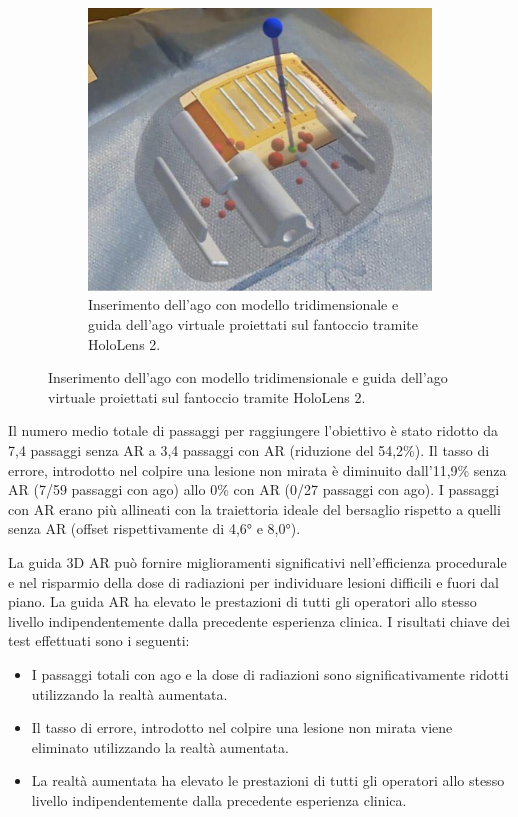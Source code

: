 \begin{figure}[t]
\begin{subfigure}{0.45\textwidth}
        \includegraphics[width=\textwidth]{images/phantom-ologram.png}
        \caption{Inserimento dell'ago con modello tridimensionale e guida dell'ago virtuale proiettati sul fantoccio tramite HoloLens 2.}
        \label{fig:figure3d}
    \end{subfigure}
       \label{fig:figure3}
\end{figure}

Il numero medio totale di passaggi per raggiungere l'obiettivo è stato ridotto da 7,4 passaggi senza AR a 3,4 passaggi con AR (riduzione del 54,2\%).
Il tasso di errore, introdotto nel colpire una lesione non mirata è diminuito dall'11,9\% senza AR (7/59 passaggi con ago) allo 0\% con AR (0/27 passaggi con ago). I passaggi con AR erano più allineati con la traiettoria ideale del bersaglio rispetto a quelli senza AR (offset rispettivamente di 4,6° e 8,0°).

La guida 3D AR può fornire miglioramenti significativi nell'efficienza procedurale e nel risparmio della dose di radiazioni per individuare lesioni difficili e fuori dal piano. La guida AR ha elevato le prestazioni di tutti gli operatori allo stesso livello indipendentemente dalla precedente esperienza clinica.
I risultati chiave dei test effettuati sono i seguenti:
\begin{itemize}
    \item I passaggi totali con ago e la dose di radiazioni sono significativamente ridotti utilizzando la realtà aumentata.
    \item Il tasso di errore, introdotto nel colpire una lesione non mirata viene eliminato utilizzando la realtà aumentata.
    \item La realtà aumentata ha elevato le prestazioni di tutti gli operatori allo stesso livello indipendentemente dalla precedente esperienza clinica.
\end{itemize}

